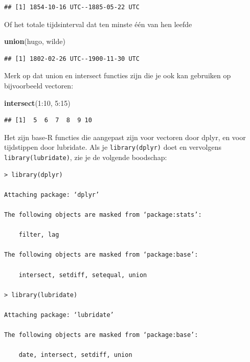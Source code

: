 \documentclass[]{tufte-book}
\newenvironment{Shaded}{}{}
\newcommand{\DecValTok}[1]{\textcolor[rgb]{0.25,0.63,0.44}{#1}}
\newcommand{\KeywordTok}[1]{\textcolor[rgb]{0.00,0.44,0.13}{\textbf{#1}}}
\newcommand{\NormalTok}[1]{#1}
\newcommand{\OperatorTok}[1]{\textcolor[rgb]{0.40,0.40,0.40}{#1}}
\begin{document}
\begin{verbatim}
## [1] 1854-10-16 UTC--1885-05-22 UTC
\end{verbatim}

Of het totale tijdsinterval dat ten minste één van hen leefde

\begin{Shaded}
\begin{Highlighting}[]
\KeywordTok{union}\NormalTok{(hugo, wilde)}
\end{Highlighting}
\end{Shaded}

\begin{verbatim}
## [1] 1802-02-26 UTC--1900-11-30 UTC
\end{verbatim}

Merk op dat union en intersect functies zijn die je ook kan gebruiken op bijvoorbeeld vectoren:

\begin{Shaded}
\begin{Highlighting}[]
\KeywordTok{intersect}\NormalTok{(}\DecValTok{1}\OperatorTok{:}\DecValTok{10}\NormalTok{, }\DecValTok{5}\OperatorTok{:}\DecValTok{15}\NormalTok{)}
\end{Highlighting}
\end{Shaded}

\begin{verbatim}
## [1]  5  6  7  8  9 10
\end{verbatim}

Het zijn base-R functies die aangepast zijn voor vectoren door dplyr, en voor tijdstippen door lubridate. Als je \texttt{library(dplyr)} doet en vervolgens \texttt{library(lubridate)}, zie je de volgende boodschap:

\begin{verbatim}
> library(dplyr)

Attaching package: ‘dplyr’

The following objects are masked from ‘package:stats’:

    filter, lag

The following objects are masked from ‘package:base’:

    intersect, setdiff, setequal, union

> library(lubridate)

Attaching package: ‘lubridate’

The following objects are masked from ‘package:base’:

    date, intersect, setdiff, union
\end{verbatim}
\end{document}
